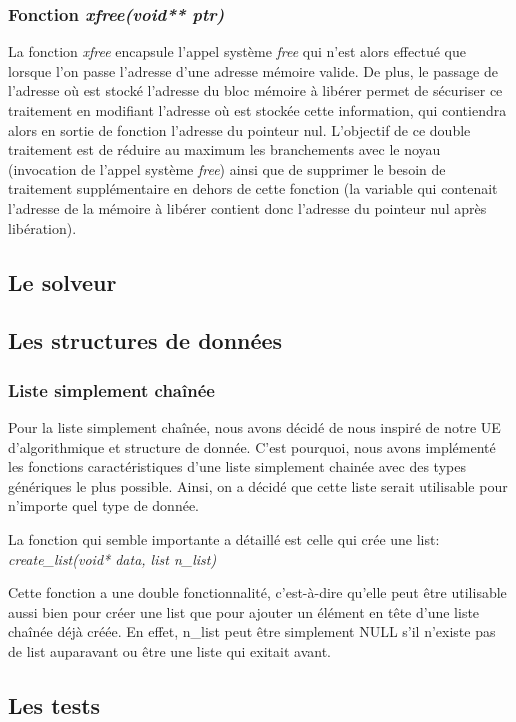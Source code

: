\documentclass{report}
\begin{document}
\subsubsection*{Fonction \textit{xfree(void** ptr)}}
La fonction \textit{xfree} encapsule l'appel système \textit{free} qui n'est alors effectué que lorsque l'on passe l'adresse d'une adresse mémoire valide.
De plus, le passage de l'adresse où est stocké l'adresse du bloc mémoire à libérer permet de sécuriser ce traitement en modifiant l'adresse où est stockée cette information, qui contiendra alors en sortie de fonction l'adresse du pointeur nul.
L'objectif de ce double traitement est de réduire au maximum les branchements avec le noyau (invocation de l'appel système \textit{free}) ainsi que de supprimer le besoin de traitement supplémentaire en dehors de cette fonction (la variable qui contenait l'adresse de la mémoire à libérer contient donc l'adresse du pointeur nul après libération).

\subsection{Le solveur}


\subsection{Les structures de données}
\subsubsection*{Liste simplement chaînée}
Pour la liste simplement chaînée, nous avons décidé de nous inspiré de notre UE d'algorithmique et structure de donnée. C'est pourquoi, nous avons implémenté les fonctions caractéristiques d'une liste simplement chainée avec des types génériques le plus possible. Ainsi, on a décidé que cette liste serait utilisable pour n'importe quel type de donnée.

La fonction qui semble importante a détaillé est celle qui crée une list: \textit{create\_list(void* data, list n\_list)}

Cette fonction a une double fonctionnalité, c'est-à-dire qu'elle peut être utilisable aussi bien pour créer une list que pour ajouter un élément en tête d'une liste chaînée déjà créée. En effet, n\_list peut être simplement NULL s'il n'existe pas de list auparavant ou être une liste qui exitait avant. 

\subsection{Les tests}
\end{document}
